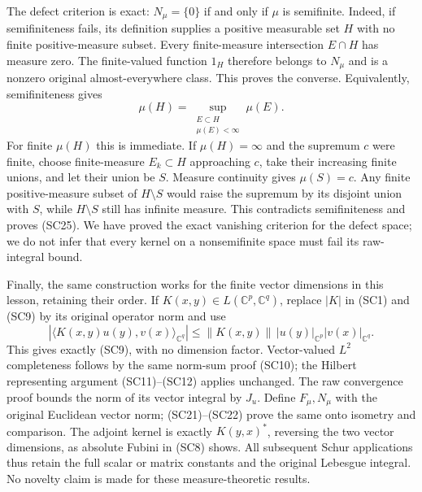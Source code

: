 \documentclass[
  11pt,
]{article}
\begin{document}
The defect criterion is exact: \(N_\mu=\{0\}\) if and only if \(\mu\) is
semifinite. Indeed, if semifiniteness fails, its definition supplies a
positive measurable set \(H\) with no finite positive-measure subset.
Every finite-measure intersection \(E\cap H\) has measure zero. The
finite-valued function \(1_H\) therefore belongs to \(N_\mu\) and is a
nonzero original almost-everywhere class. This proves the converse.
Equivalently, semifiniteness gives \[
 \mu(H)=\sup_{\substack{E\subset H\\\mu(E)<\infty}}\mu(E).
 \tag{SC25}
\] For finite \(\mu(H)\) this is immediate. If \(\mu(H)=\infty\) and the
supremum \(c\) were finite, choose finite-measure \(E_k\subset H\)
approaching \(c\), take their increasing finite unions, and let their
union be \(S\). Measure continuity gives \(\mu(S)=c\). Any finite
positive-measure subset of \(H\setminus S\) would raise the supremum by
its disjoint union with \(S\), while \(H\setminus S\) still has infinite
measure. This contradicts semifiniteness and proves (SC25). We have
proved the exact vanishing criterion for the defect space; we do not
infer that every kernel on a nonsemifinite space must fail its
raw-integral bound.

Finally, the same construction works for the finite vector dimensions in
this lesson, retaining their order. If
\(K(x,y)\in L(\mathbb C^p,\mathbb C^q)\), replace \(|K|\) in (SC1) and
(SC9) by its original operator norm and use \[
 |\langle K(x,y)u(y),v(x)\rangle_{\mathbb C^q}|
 \leq\|K(x,y)\|\,|u(y)|_{\mathbb C^p}|v(x)|_{\mathbb C^q}.
 \tag{SC26}
\] This gives exactly (SC9), with no dimension factor. Vector-valued
\(L^2\) completeness follows by the same norm-sum proof (SC10); the
Hilbert representing argument (SC11)--(SC12) applies unchanged. The raw
convergence proof bounds the norm of its vector integral by \(J_u\).
Define \(F_\mu,N_\mu\) with the original Euclidean vector norm;
(SC21)--(SC22) prove the same onto isometry and comparison. The adjoint
kernel is exactly \(K(y,x)^*\), reversing the two vector dimensions, as
absolute Fubini in (SC8) shows. All subsequent Schur applications thus
retain the full scalar or matrix constants and the original Lebesgue
integral. No novelty claim is made for these measure-theoretic results.
\end{document}
